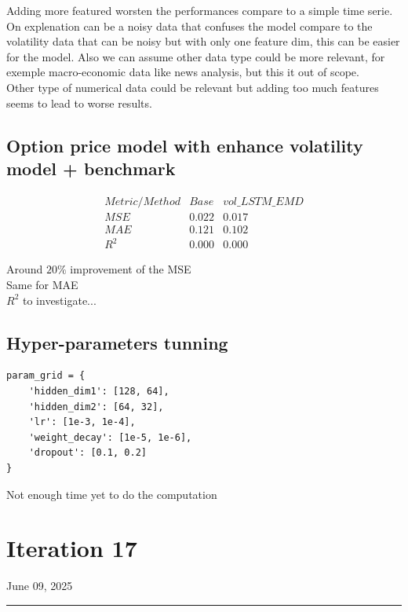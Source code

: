 \documentclass[letterpaper,11pt]{article}
\begin{document}
Adding more featured worsten the performances compare to a simple time serie. On explenation can be a noisy data that confuses the model compare to the volatility data that can be noisy but with only one feature dim, this can be easier for the model. Also we can assume other data type could be more relevant, for exemple macro-economic data like news analysis, but this it out of scope.\\

Other type of numerical data could be relevant but adding too much features seems to lead to worse results.


\bigskip

\subsection*{Option price model with enhance volatility model + benchmark}


\bigskip
\[
\begin{array}{ccc}
Metric/Method & Base & vol\_LSTM\_EMD \\
\hline
MSE & 0.022 & 0.017\\
MAE & 0.121 & 0.102 \\
R^{2} & 0.000 & 0.000 
\end{array}
\]
\bigskip

Around $20\%$ improvement of the MSE\\
Same for MAE\\
$R^2$ to investigate...
\bigskip
\subsection*{Hyper-parameters tunning}


\begin{verbatim}
param_grid = {
    'hidden_dim1': [128, 64],
    'hidden_dim2': [64, 32],
    'lr': [1e-3, 1e-4],
    'weight_decay': [1e-5, 1e-6],
    'dropout': [0.1, 0.2]
}
\end{verbatim}

Not enough time yet to do the computation 









\newpage
\section*{Iteration 17}
\begin{flushright}
June 09, 2025
\end{flushright}
\hrule
\vspace{0.2in}
\end{document}

